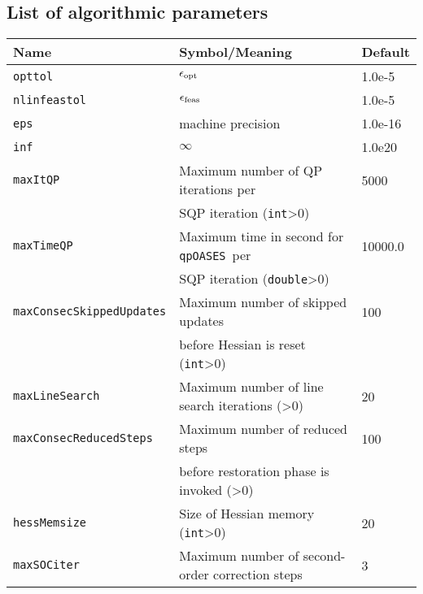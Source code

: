 \documentclass[	11pt,
				a4paper,
				abstract=true,
				twoside=true,
				bibliography=totoc, 
				headinclude=true,
				footinclude=false]{scrartcl}
\newcommand{\qpOASES}{\texttt{qpOASES}}
\begin{document}
\subsection{List of algorithmic parameters}\label{sec:alg-pars}
\begin{longtable}[c]{lll}
Name 							& Symbol/Meaning												& Default			\\\hline\hline
%
\texttt{opttol}					& $\epsilon_{\textup{opt}}$ 									& 1.0e-5	\\\hline
%
\texttt{nlinfeastol}			& $\epsilon_{\textup{feas}}$									& 1.0e-5	\\\hline
%
\texttt{eps}					& machine precision												& 1.0e-16	\\\hline
%
\texttt{inf}					& $\infty$														& 1.0e20	\\\hline
%
\texttt{maxItQP}				& Maximum number of QP iterations per							& 5000		\\
								& SQP iteration (\texttt{int}>0)								&			\\\hline
%
\texttt{maxTimeQP}				& Maximum time in second for \qpOASES\ per						& 10000.0		\\
								& SQP iteration (\texttt{double}>0)								&			\\\hline
%
\texttt{maxConsecSkippedUpdates}& Maximum number of skipped updates 							& 100		\\
								& before Hessian is reset (\texttt{int}>0)						&			\\\hline
%
\texttt{maxLineSearch}			& Maximum number of line search iterations (\text{int}>0)		& 20		\\\hline
%
\texttt{maxConsecReducedSteps}	& Maximum number of reduced steps 								& 100		\\
								& before restoration phase is invoked (\text{int}>0)			&			\\\hline
%
\texttt{hessMemsize}			& Size of Hessian memory (\texttt{int}>0)						& 20		\\\hline
%
\texttt{maxSOCiter}				& Maximum number of second-order correction steps				& 3			\\\hline
\end{longtable}
\end{document}
